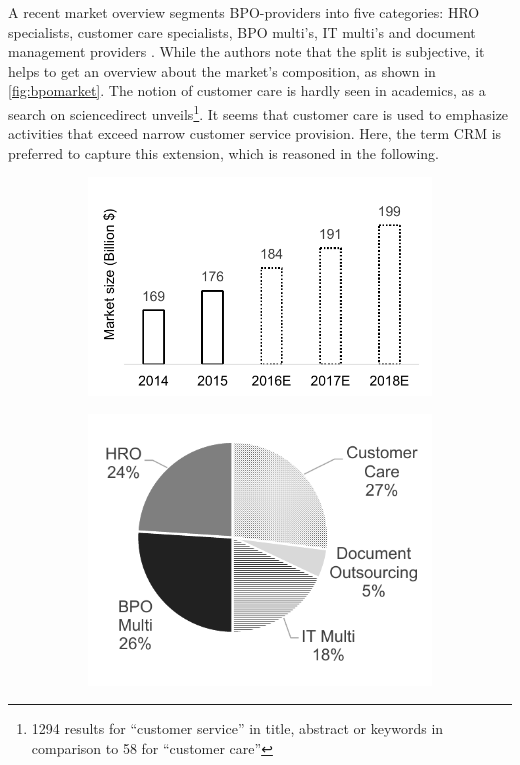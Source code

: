 		A recent market overview segments BPO-providers into five categories: \acrfull{HRO} specialists, customer care specialists, BPO multi's, IT multi's and document management providers \citep{hfs2016top}.  While the authors note that the split is subjective, it helps to get an overview about the market's composition, as shown in \Fig \ref{fig:bpomarket}. The notion of customer care is hardly seen in academics, as a search on sciencedirect unveils\footnote{1294 results for \enquote{customer service} in title, abstract or keywords in comparison to 58 for \enquote{customer care}}. It seems that customer care is used to emphasize activities that exceed narrow customer service provision. Here, the term \acrshort{CRM} is preferred to capture this extension, which is reasoned in the following.	
			
		\begin{figure}[caption={BPO Market Composition}, label={fig:bpomarket}]
			{
				\begin{subfigure}[b]{0.45\textwidth}
					\includegraphics[width=.8\textwidth]{figures/bpomarket.pdf}
				\end{subfigure}
			\begin{subfigure}[b]{0.45\textwidth}
				\includegraphics[width=.8\textwidth]{figures/bpotypes.pdf}
			\end{subfigure}
					
		 \parbox{0.8\textwidth}{	} }
			
		\end{figure}

